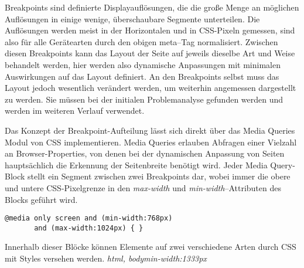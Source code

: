 Breakpoints sind definierte Displayauflösungen, die die große Menge an möglichen Auflösungen in einige wenige, überschaubare Segmente unterteilen.
Die Auflösungen werden meist in der Horizontalen und in CSS-Pixeln gemessen, sind also für alle Gerätearten durch den obigen meta--Tag normalisiert.
Zwischen diesen Breakpoints kann das Layout der Seite auf jeweils dieselbe Art und Weise behandelt werden, hier werden also dynamische Anpassungen mit minimalen Auswirkungen auf das Layout definiert.
An den Breakpoints selbst muss das Layout jedoch wesentlich verändert werden, um weiterhin angemessen dargestellt zu werden.
Sie müssen bei der initialen Problemanalyse gefunden werden und werden im weiteren Verlauf verwendet.

Das Konzept der Breakpoint-Aufteilung lässt sich direkt über das Media Queries Modul von CSS implementieren.
\autocite{JiangResponsiveWebDesignModeAndApplication.2014}
Media Queries erlauben Abfragen einer Vielzahl an Browser-Properties, von denen bei der dynamischen Anpassung von Seiten hauptsächlich die Erkennung der Seitenbreite benötigt wird.
Jeder Media Query-Block stellt ein Segment zwischen zwei Breakpoints dar, wobei immer die obere und untere CSS-Pixelgrenze in den \emph{max-width} und \emph{min-width}--Attributen des Blocks geführt wird.

\begin{verbatim}
@media only screen and (min-width:768px)
       and (max-width:1024px) { }
\end{verbatim}

Innerhalb dieser Blöcke können Elemente auf zwei verschiedene Arten durch CSS mit Styles versehen werden.
\emph{html, body{min-width:1333px}}
\autocite{JiangResponsiveWebDesignModeAndApplication.2014}
